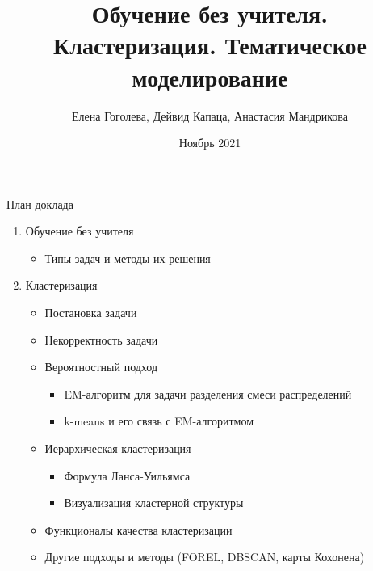 \documentclass{beamer}
\title[Кластеризация и тематические модели]
{Обучение без учителя. Кластеризация. Тематическое моделирование}
\author[Гоголева, Капаца, Мандрикова]{Елена Гоголева, Дейвид Капаца, Анастасия Мандрикова}
\institute
{
  Санкт-Петербургский государственный университет\\
  Прикладная математика и информатика\\
  Вычислительная стохастика и статистические модели\\
  \vspace{0.5cm}
  Семинар по статистическому и машинному обучению\\
}
\date{Ноябрь 2021}
\begin{document}
\begin{frame}
  \titlepage
\end{frame}

\begin{frame}{План доклада}
\begin{enumerate}
    \item Обучение без учителя
    \begin{itemize}
        \item Типы задач и методы их решения
    \end{itemize}
    \item Кластеризация
    \begin{itemize}
        \item Постановка задачи
        \item Некорректность задачи
        \item Вероятностный подход
        \begin{itemize}
            \item EM-алгоритм для задачи разделения смеси распределений
            \item k-means и его связь с EM-алгоритмом
        \end{itemize}
        \item Иерархическая кластеризация
        \begin{itemize}
            \item Формула Ланса-Уильямса
            \item Визуализация кластерной структуры
        \end{itemize}
        \item Функционалы качества кластеризации
        \item Другие подходы и методы (FOREL, DBSCAN, карты Кохонена)
    \end{itemize}
\end{enumerate}
\end{frame}
\end{document}
